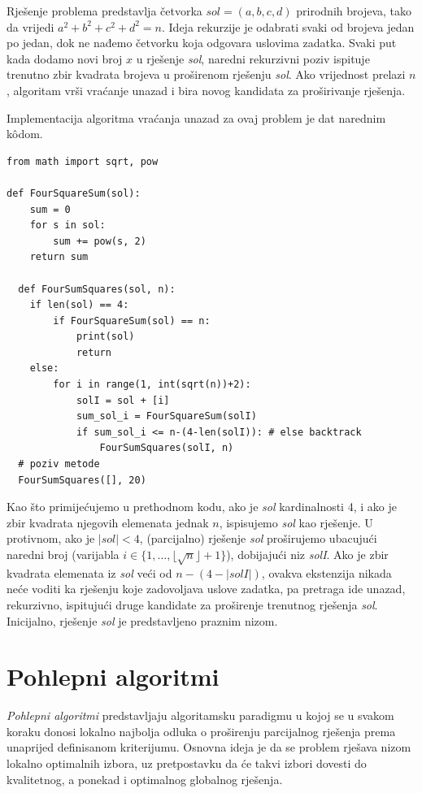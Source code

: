 \begin{solution}
	Rješenje problema predstavlja četvorka $sol = (a, b, c, d)$ prirodnih brojeva, tako da vrijedi $a^2 + b^2 + c^2 + d^2 = n$. Ideja rekurzije je odabrati svaki  od brojeva jedan po jedan, dok ne nađemo četvorku koja odgovara uslovima zadatka. Svaki put kada dodamo novi broj $x$ u rješenje \emph{sol}, naredni rekurzivni poziv ispituje trenutno zbir kvadrata brojeva u proširenom rješenju \emph{sol}. Ako vrijednost prelazi $n$, algoritam vrši vraćanje unazad i bira novog kandidata za proširivanje rješenja. 
	
 Implementacija algoritma vraćanja unazad za ovaj problem je dat narednim k\^odom.
 
 \begin{verbatim}
from math import sqrt, pow

def FourSquareSum(sol):
	sum = 0
	for s in sol:
		sum += pow(s, 2)
	return sum

  def FourSumSquares(sol, n):
	if len(sol) == 4:
		if FourSquareSum(sol) == n:
			print(sol)
			return 
	else:
		for i in range(1, int(sqrt(n))+2):
			solI = sol + [i]
			sum_sol_i = FourSquareSum(solI)
			if sum_sol_i <= n-(4-len(solI)): # else backtrack  
				FourSumSquares(solI, n) 
  # poziv metode
  FourSumSquares([], 20)
 \end{verbatim}
	
	Kao što primijećujemo u prethodnom kodu, ako je \emph{sol} kardinalnosti 4, i ako je zbir kvadrata njegovih elemenata jednak $n$, ispisujemo \emph{sol} kao rješenje. U protivnom, ako je $|sol|<4$, (parcijalno) rješenje \emph{sol} proširujemo ubacujući naredni broj (varijabla $i\in \{1, \ldots, \lfloor\sqrt{n} \rfloor + 1 \}$), dobijajući niz \emph{solI}.  Ako je zbir kvadrata elemenata iz \emph{sol} veći od $n-(4 - |solI|)$, ovakva ekstenzija nikada neće voditi ka rješenju koje zadovoljava uslove zadatka, pa pretraga ide unazad, rekurzivno,  ispitujući druge kandidate za proširenje trenutnog rješenja \emph{sol}. Inicijalno, rješenje \emph{sol} je predstavljeno praznim nizom.
	 
\end{solution}
 
 
\section{Pohlepni algoritmi}

\textit{Pohlepni algoritmi}  predstavljaju algoritamsku paradigmu u kojoj se u svakom koraku donosi lokalno najbolja odluka o proširenju parcijalnog rješenja prema unaprijed definisanom kriterijumu. Osnovna ideja je da se problem rješava nizom lokalno optimalnih izbora, uz pretpostavku da će takvi izbori dovesti do kvalitetnog, a ponekad i optimalnog globalnog rješenja.

